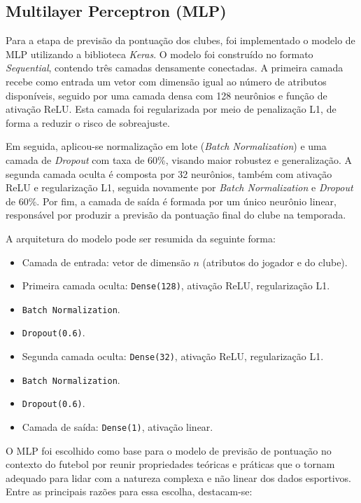 \subsection{Multilayer Perceptron (MLP)}

Para a etapa de previsão da pontuação dos clubes, foi implementado o modelo de MLP utilizando a biblioteca \textit{Keras}. O modelo foi construído 
no formato \textit{Sequential}, contendo três camadas densamente conectadas. A primeira camada recebe como entrada um vetor com dimensão igual ao 
número de atributos disponíveis, seguido por uma camada densa com 128 neurônios e função de ativação ReLU. Esta camada foi regularizada por meio de penalização L1, de 
forma a reduzir o risco de sobreajuste. 

Em seguida, aplicou-se normalização em lote (\textit{Batch Normalization}) e uma camada de \textit{Dropout} com taxa de 60\%, visando maior robustez e generalização. 
A segunda camada oculta é composta por 32 neurônios, também com ativação ReLU e regularização L1, seguida novamente por \textit{Batch Normalization} e \textit{Dropout} 
de 60\%. Por fim, a camada de saída é formada por um único neurônio linear, responsável por produzir a previsão da pontuação final do clube na temporada.

A arquitetura do modelo pode ser resumida da seguinte forma:

\begin{itemize}
    \item Camada de entrada: vetor de dimensão $n$ (atributos do jogador e do clube).
    \item Primeira camada oculta: \texttt{Dense(128)}, ativação ReLU, regularização L1.
    \item \texttt{Batch Normalization}.
    \item \texttt{Dropout(0.6)}.
    \item Segunda camada oculta: \texttt{Dense(32)}, ativação ReLU, regularização L1.
    \item \texttt{Batch Normalization}.
    \item \texttt{Dropout(0.6)}.
    \item Camada de saída: \texttt{Dense(1)}, ativação linear.
\end{itemize}
O MLP foi escolhido como base para o modelo de previsão de pontuação no contexto do futebol por reunir propriedades teóricas e práticas que o tornam adequado para 
lidar com a natureza complexa e não linear dos dados esportivos. Entre as principais razões para essa escolha, destacam-se:

